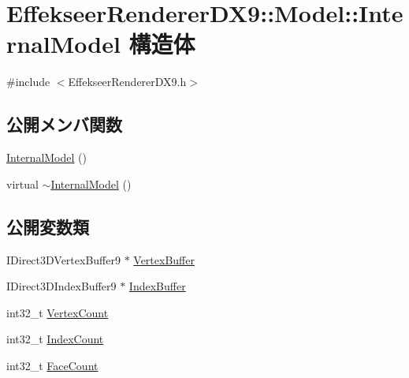 \hypertarget{struct_effekseer_renderer_d_x9_1_1_model_1_1_internal_model}{}\section{Effekseer\+Renderer\+D\+X9\+:\+:Model\+:\+:Internal\+Model 構造体}
\label{struct_effekseer_renderer_d_x9_1_1_model_1_1_internal_model}


{\ttfamily \#include $<$Effekseer\+Renderer\+D\+X9.\+h$>$}

\subsection*{公開メンバ関数}
\begin{DoxyCompactItemize}
\item 
\mbox{\hyperlink{struct_effekseer_renderer_d_x9_1_1_model_1_1_internal_model_aeb5dc73f9ecb10a23c2d578c7820e8d4}{Internal\+Model}} ()
\item 
virtual \mbox{\hyperlink{struct_effekseer_renderer_d_x9_1_1_model_1_1_internal_model_a45d01b194eff847edaf851e18b9a0d30}{$\sim$\+Internal\+Model}} ()
\end{DoxyCompactItemize}
\subsection*{公開変数類}
\begin{DoxyCompactItemize}
\item 
I\+Direct3\+D\+Vertex\+Buffer9 $\ast$ \mbox{\hyperlink{struct_effekseer_renderer_d_x9_1_1_model_1_1_internal_model_ae47af8573eafc74b9342778439bcfc62}{Vertex\+Buffer}}
\item 
I\+Direct3\+D\+Index\+Buffer9 $\ast$ \mbox{\hyperlink{struct_effekseer_renderer_d_x9_1_1_model_1_1_internal_model_ace4083c8355629075124774216172671}{Index\+Buffer}}
\item 
int32\+\_\+t \mbox{\hyperlink{struct_effekseer_renderer_d_x9_1_1_model_1_1_internal_model_a1eec4f06fe34a77750440a003b9aa7af}{Vertex\+Count}}
\item 
int32\+\_\+t \mbox{\hyperlink{struct_effekseer_renderer_d_x9_1_1_model_1_1_internal_model_a83be9b876bc09a578cd6b93d175142f9}{Index\+Count}}
\item 
int32\+\_\+t \mbox{\hyperlink{struct_effekseer_renderer_d_x9_1_1_model_1_1_internal_model_a7c81ad7dac9a6cdb45ea68f1f1a664ef}{Face\+Count}}
\end{DoxyCompactItemize}


